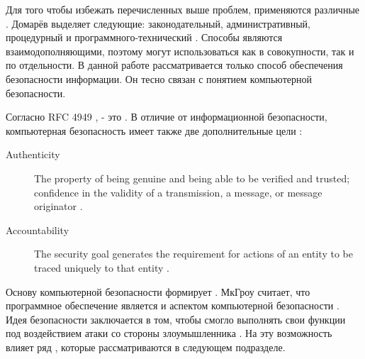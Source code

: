 %
Для того чтобы избежать перечисленных выше проблем, применяются различные .
%
Домарёв выделяет следующие: законодательный, административный, процедурный и программного-технический . 
%
Способы являются взаимодополняющими, поэтому могут использоваться как в совокупности, так и по отдельности. 
%
В данной работе рассматривается только  способ обеспечения безопасности информации.
%
Он тесно связан с понятием компьютерной безопасности.

%
Согласно RFC 4949 ,  - это .
%
В отличие от информационной безопасности, компьютерная безопасность имеет также две дополнительные цели : 
%
\begin{description}

	\item[Authenticity] The property of being genuine and being able to be verified and trusted; confidence in the validity of a transmission, a message, or message originator .

	\item[Accountability] The security goal generates the requirement for actions of an entity to be traced uniquely to that entity .
\end{description}

%
Основу компьютерной безопасности формирует .
%
МкГроу считает, что программное обеспечение является  и  аспектом компьютерной безопасности . 
%
Идея безопасности  заключается в том, чтобы  смогло  выполнять свои функции под воздействием атаки со стороны злоумышленника .
%
На эту возможность влияет ряд , которые рассматриваются в следующем подразделе.